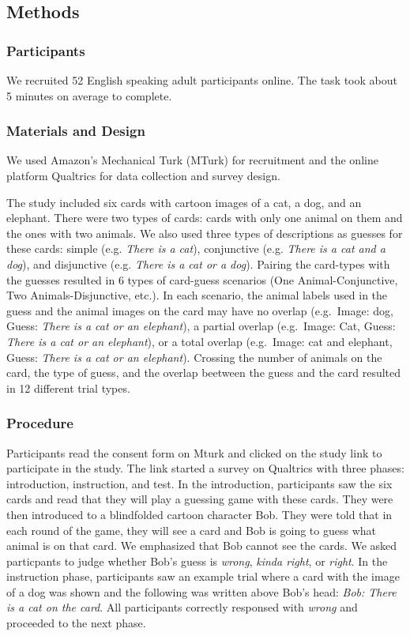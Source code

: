 \documentclass[10pt, letterpaper]{article}
\begin{document}
\subsection{Methods}\label{methods}

\subsubsection{Participants}\label{participants}

We recruited 52 English speaking adult participants online. The task
took about 5 minutes on average to complete.

\subsubsection{Materials and Design}\label{materials-and-design}

We used Amazon's Mechanical Turk (MTurk) for recruitment and the online
platform Qualtrics for data collection and survey design.

The study included six cards with cartoon images of a cat, a dog, and an
elephant. There were two types of cards: cards with only one animal on
them and the ones with two animals. We also used three types of
descriptions as guesses for these cards: simple (e.g. \emph{There is a
cat}), conjunctive (e.g. \emph{There is a cat and a dog}), and
disjunctive (e.g. \emph{There is a cat or a dog}). Pairing the
card-types with the guesses resulted in 6 types of card-guess scenarios
(One Animal-Conjunctive, Two Animals-Disjunctive, etc.). In each
scenario, the animal labels used in the guess and the animal images on
the card may have no overlap (e.g.~Image: dog, Guess: \emph{There is a
cat or an elephant}), a partial overlap (e.g.~Image: Cat, Guess:
\emph{There is a cat or an elephant}), or a total overlap (e.g.~Image:
cat and elephant, Guess: \emph{There is a cat or an elephant}). Crossing
the number of animals on the card, the type of guess, and the overlap
beetween the guess and the card resulted in 12 different trial types.

\subsubsection{Procedure}\label{procedure}

Participants read the consent form on Mturk and clicked on the study
link to participate in the study. The link started a survey on Qualtrics
with three phases: introduction, instruction, and test. In the
introduction, participants saw the six cards and read that they will
play a guessing game with these cards. They were then introduced to a
blindfolded cartoon character Bob. They were told that in each round of
the game, they will see a card and Bob is going to guess what animal is
on that card. We emphasized that Bob cannot see the cards. We asked
particpants to judge whether Bob's guess is \emph{wrong}, \emph{kinda
right}, or \emph{right}. In the instruction phase, participants saw an
example trial where a card with the image of a dog was shown and the
following was written above Bob's head: \emph{Bob: There is a cat on the
card}. All participants correctly responsed with \emph{wrong} and
proceeded to the next phase.
\end{document}
